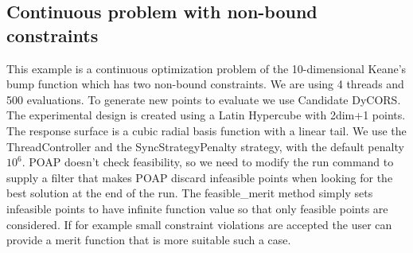 \documentclass[]{article}
\begin{document}
\subsection{Continuous problem with non-bound constraints}
This example is a continuous optimization problem of the 10-dimensional Keane's bump function which has two non-bound constraints. We are using 4 threads and 500 evaluations. To generate new points to evaluate we use Candidate DyCORS. The experimental design is created using a Latin Hypercube with 2dim+1 points. The response surface is a cubic radial basis function with a linear tail. We use the ThreadController and the SyncStrategyPenalty strategy, with the default penalty $10^6$. POAP doesn't check feasibility, so we need to modify the run command to supply a filter that makes POAP discard infeasible points when looking for the best solution at the end of the run. The feasible\_merit method simply sets infeasible points to have infinite function value so that only feasible points are considered. If for example small constraint violations are accepted the user can provide a merit function that is more suitable such a case.
\end{document}
